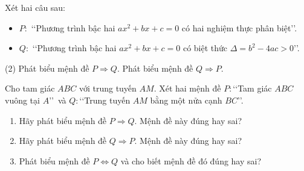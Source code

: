 \begin{vd}
	Xét hai câu sau:
	\begin{itemize}
		\item [] $P \colon $ \lq\lq Phương trình bậc hai $ax^2+bx+c=0$ có hai nghiệm thực phân biệt\rq\rq.
		\item [] $Q \colon $ \lq\lq Phương trình bậc hai $ax^2+bx+c=0$ có biệt thức $\Delta = b^2-4ac>0$\rq\rq.
	\end{itemize}
\begin{tasks}(2)
	\task Phát biểu mệnh đề $P \Rightarrow Q$.
	\task Phát biểu mệnh đề $Q \Rightarrow P$.
\end{tasks}

\end{vd}
\begin{vd}
	Cho tam giác $ABC$ với trung tuyến $AM$. Xét hai mệnh đề	$P\colon $\lq\lq Tam giác $ABC$ vuông tại $A$\rq\rq \, và
	$Q\colon $\lq\lq Trung tuyến $AM$ bằng một nửa cạnh $BC$\rq\rq.
	\begin{enumerate}
		\item Hãy phát biểu mệnh đề $P\Rightarrow Q$. Mệnh đề này đúng hay sai?
		\item Hãy phát biểu mệnh đề $Q\Rightarrow P$. Mệnh đề này đúng hay sai?
		\item Phát biểu mệnh đề $P\Leftrightarrow Q$ và cho biết mệnh đề đó đúng hay sai?
	\end{enumerate}
\end{vd}

